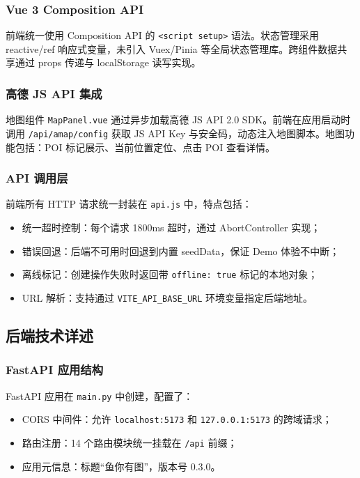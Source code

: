 \documentclass[12pt,a4paper]{ctexart}
\begin{document}
\subsubsection{Vue 3 Composition API}

前端统一使用 Composition API 的 \texttt{<script setup>} 语法。状态管理采用 reactive/ref 响应式变量，未引入 Vuex/Pinia 等全局状态管理库。跨组件数据共享通过 props 传递与 localStorage 读写实现。

\subsubsection{高德 JS API 集成}

地图组件 \texttt{MapPanel.vue} 通过异步加载高德 JS API 2.0 SDK。前端在应用启动时调用 \texttt{/api/amap/config} 获取 JS API Key 与安全码，动态注入地图脚本。地图功能包括：POI 标记展示、当前位置定位、点击 POI 查看详情。

\subsubsection{API 调用层}

前端所有 HTTP 请求统一封装在 \texttt{api.js} 中，特点包括：
\begin{itemize}
  \item 统一超时控制：每个请求 1800ms 超时，通过 AbortController 实现；
  \item 错误回退：后端不可用时回退到内置 seedData，保证 Demo 体验不中断；
  \item 离线标记：创建操作失败时返回带 \texttt{offline: true} 标记的本地对象；
  \item URL 解析：支持通过 \texttt{VITE\_API\_BASE\_URL} 环境变量指定后端地址。
\end{itemize}

\subsection{后端技术详述}

\subsubsection{FastAPI 应用结构}

FastAPI 应用在 \texttt{main.py} 中创建，配置了：
\begin{itemize}
  \item CORS 中间件：允许 \texttt{localhost:5173} 和 \texttt{127.0.0.1:5173} 的跨域请求；
  \item 路由注册：14 个路由模块统一挂载在 \texttt{/api} 前缀；
  \item 应用元信息：标题“鱼你有图”，版本号 0.3.0。
\end{itemize}
\end{document}
